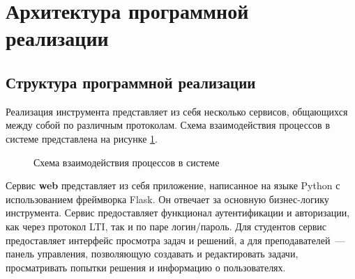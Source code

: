 \documentclass[a4paper,article,14pt]{extarticle}
\begin{document}
\section{Архитектура программной реализации}

\subsection{Структура программной реализации}

Реализация инструмента представляет из себя несколько сервисов, общающихся между собой по различным протоколам. Схема взаимодействия процессов в системе представлена на рисунке \ref{fig:processes_arch}.

\begin{figure}[ht]
    \begin{center}
        \caption{\label{fig:processes_arch} Схема взаимодействия процессов в системе}
    \end{center}
\end{figure}

Сервис \textbf{web} представляет из себя приложение, написанное на языке Python с использованием фреймворка Flask. Он отвечает за основную бизнес-логику инструмента. Сервис предоставляет функционал аутентификации и авторизации, как через протокол LTI, так и по паре логин/пароль. Для студентов сервис предоставляет интерфейс просмотра задач и решений, а для преподавателей~--- панель управления, позволяющую создавать и редактировать задачи, просматривать попытки решения и информацию о пользователях.
\end{document}
